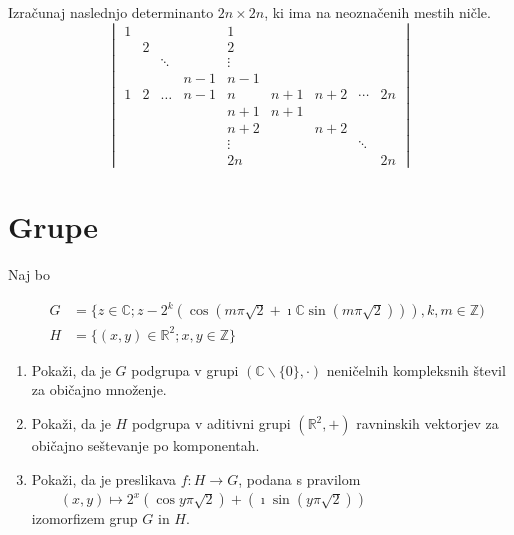 \documentclass[a4paper,12pt]{article}
\begin{document}
Izračunaj naslednjo determinanto \(2n \times 2n\), ki ima na neoznačenih mestih ničle.
$$
\begin{vmatrix}
 1 & & & & 1\\
 & 2 & & & 2\\
&&\ddots & & \vdots\\
&&& n-1  & n-1\\
 1 & 2 &\dots& n-1 & n & n+1&  n+2 & \cdots&2n\\
&&&& n+1 & n+1\\
&&&& n+2 && n+2\\
&&&&\vdots&&&\ddots\\
 &&&&2n &&&& 2n
\end{vmatrix}
$$
\section*{Grupe}

Naj bo

\begin{align*}
\quad G&=  \{ z \in \mathbb{C} ; z-2^k(\cos(m\pi\sqrt{2}+\imath\mathbb{C} \sin(m\pi\sqrt{2}))),k,m\in\mathbb{Z})\\
\quad H &=\{(x,y)\in \mathbb{R}^2; x,y\in \mathbb{Z} \}
\end{align*}

 
\begin{enumerate}
\item
Pokaži, da je \(G\) podgrupa v grupi $(\mathbb{C} \backslash  \{0\},\cdot)$
neničelnih kompleksnih števil za običajno množenje.

\item
Pokaži, da je \(H\) podgrupa v aditivni grupi $(\mathbb{R} ^2, +)$
ravninskih vektorjev za običajno seštevanje po komponentah.

\item
Pokaži, da je preslikava \(f:H\to G\), podana s pravilom\\
$\qquad (x,y)\mapsto 2^x(\cos y\pi\sqrt{2})+(\imath\sin(y\pi\sqrt{2}))$\\
izomorfizem grup \(G\) in \(H\).
\end{enumerate}
\end{document}
